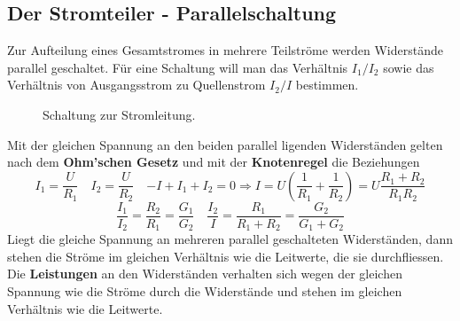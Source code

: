 \subsection{Der Stromteiler - Parallelschaltung}
Zur Aufteilung eines Gesamtstromes in mehrere Teilströme werden Widerstände parallel geschaltet. Für eine Schaltung will man das Verhältnis $I_1/I_2$ sowie das Verhältnis von Ausgangsstrom zu Quellenstrom $I_2/I$ bestimmen. 
\begin{figure}[H]
\centering
\caption{Schaltung zur Stromleitung.}
\label{fig_IIIr}
\end{figure}
\noindent Mit der gleichen Spannung an den beiden parallel ligenden Widerständen gelten nach dem \textbf{Ohm'schen Gesetz} und mit der \textbf{Knotenregel} die Beziehungen
\begin{equation}
\boxed{I_1=\dfrac{U}{R_1}}\quad \boxed{I_2=\dfrac{U}{R_2}}\quad \boxed{-I+I_1+I_2=0\Longrightarrow I=U\left(\dfrac{1}{R_1}+\dfrac{1}{R_2}\right)=U\dfrac{R_1+R_2}{R_1R_2}}
\end{equation}
\begin{equation}
\boxed{\dfrac{I_1}{I_2}=\dfrac{R_2}{R_1}=\dfrac{G_1}{G_2}}\quad \boxed{\dfrac{I_2}{I}=\dfrac{R_1}{R_1+R_2}=\dfrac{G_2}{G_1+G_2}}
\end{equation}
Liegt die gleiche Spannung an mehreren parallel geschalteten Widerständen, dann stehen die Ströme im gleichen Verhältnis wie die Leitwerte, die sie durchfliessen. Die \textbf{Leistungen} an den Widerständen verhalten sich wegen der gleichen Spannung wie die Ströme durch die Widerstände und stehen im gleichen Verhältnis wie die Leitwerte.
